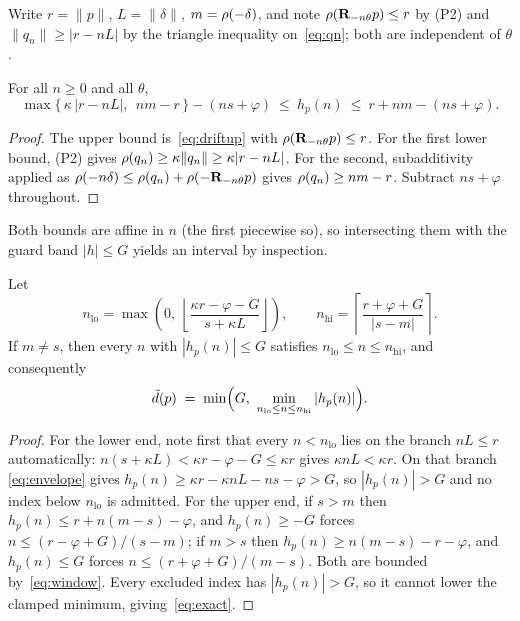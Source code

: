 Write $r=\lVert p\rVert$, $L=\lVert\delta\rVert$, $m=\rho(-\delta)$, and note
$\rho(\mathbf{R}_{-n\theta}p)\le r$ by (P2) and
$\lVert q_n\rVert \ge |r - nL|$ by the triangle inequality on~\eqref{eq:qn};
both are independent of $\theta$.

\begin{lemma}
\label{lem:envelope}
For all $n \ge 0$ and all $\theta$,
\begin{equation}
  \max\bigl\{\, \kappa\,|r - nL|,\ \ nm - r \,\bigr\} - (ns+\varphi)
  \ \le\ h_p(n)\ \le\ r + nm - (ns+\varphi).
  \label{eq:envelope}
\end{equation}
\end{lemma}

\begin{proof}
The upper bound is~\eqref{eq:driftup} with $\rho(\mathbf{R}_{-n\theta}p)\le r$. For the
first lower bound, (P2) gives $\rho(q_n) \ge \kappa\lVert q_n\rVert \ge
\kappa|r-nL|$. For the second, subadditivity applied as
$\rho(-n\delta) \le \rho(q_n) + \rho(-\mathbf{R}_{-n\theta}p)$ gives
$\rho(q_n) \ge nm - r$. Subtract $ns+\varphi$ throughout.
\end{proof}

Both bounds are affine in $n$ (the first piecewise so), so intersecting them with
the guard band $|h|\le G$ yields an interval by inspection.

\begin{theorem}
\label{thm:window}
Let
\begin{equation}
  n_{\mathrm{lo}} = \max\left(0,\ \left\lfloor \frac{\kappa r - \varphi - G}{s + \kappa L} \right\rfloor\right),
  \qquad
  n_{\mathrm{hi}} = \left\lceil \frac{r + \varphi + G}{|s - m|} \right\rceil .
  \label{eq:window}
\end{equation}
If $m \neq s$, then every $n$ with $|h_p(n)| \le G$ satisfies
$n_{\mathrm{lo}} \le n \le n_{\mathrm{hi}}$, and consequently
\begin{equation}
  \tilde d(p) \;=\; \min\Bigl(G,\ \min_{n_{\mathrm{lo}} \le n \le n_{\mathrm{hi}}} |h_p(n)|\Bigr).
  \label{eq:exact}
\end{equation}
\end{theorem}

\begin{proof}
For the lower end, note first that every $n < n_{\mathrm{lo}}$ lies on the
branch $nL\le r$ automatically: $n(s+\kappa L) < \kappa r - \varphi - G \le
\kappa r$ gives $\kappa nL < \kappa r$. On that branch \eqref{eq:envelope}
gives $h_p(n) \ge \kappa r - \kappa nL - ns - \varphi > G$, so
$|h_p(n)| > G$ and no index below $n_{\mathrm{lo}}$ is admitted. For the upper
end, if $s>m$ then $h_p(n) \le r + n(m-s) - \varphi$, and $h_p(n)\ge -G$ forces
$n \le (r - \varphi + G)/(s-m)$; if $m>s$ then $h_p(n) \ge n(m-s) - r - \varphi$,
and $h_p(n)\le G$ forces $n \le (r + \varphi + G)/(m-s)$. Both are bounded
by~\eqref{eq:window}. Every excluded index has $|h_p(n)|>G$, so it cannot lower
the clamped minimum, giving~\eqref{eq:exact}.
\end{proof}


